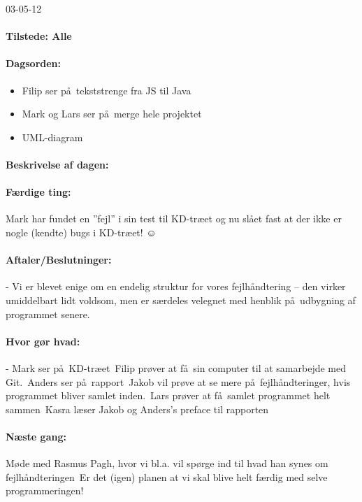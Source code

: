 \documentclass[a4paper,10pt,titlepage]{article}
\begin{document}
\begin{center}
		03-05-12
		\end{center}
		
		\paragraph{Tilstede: Alle}
		\paragraph{Dagsorden:}
		\begin{itemize}
					\item Filip ser p\aa \ tekststrenge fra JS til Java
					\item Mark og Lars ser p\aa \ merge hele projektet
					\item UML-diagram
		\end{itemize}
		
		\paragraph{Beskrivelse af dagen:}
		
		\paragraph{F\ae rdige ting:}
		Mark har fundet en ”fejl” i sin test til KD-tr\ae et og nu sl\aa et fast at der ikke er nogle (kendte) bugs i KD-tr\ae et! ☺ 
		\paragraph{Aftaler/Beslutninger:}
		-	Vi er blevet enige om en endelig struktur for vores fejlh\aa ndtering – den virker umiddelbart lidt voldsom, men er s\ae rdeles velegnet med henblik p\aa \ udbygning af programmet senere.
		\paragraph{Hvor g\o r hvad:}
		-	Mark ser p\aa \ KD-tr\ae et\
Filip pr\o ver at f\aa \ sin computer til at samarbejde med Git.\
Anders ser p\aa \ rapport\
Jakob vil pr\o ve at se mere p\aa \ fejlh\aa ndteringer, hvis programmet bliver samlet inden.\
Lars pr\o ver at f\aa \ samlet programmet helt sammen\
Kasra l\ae ser Jakob og Anders’s preface til rapporten

		\paragraph{N\ae ste gang:}
		M\o de med Rasmus Pagh, hvor vi bl.a. vil sp\o rge ind til hvad han synes om fejlh\aa ndteringen\
Er det (igen) planen at vi skal blive helt f\ae rdig med selve programmeringen!\mbox{}\\
\end{document}
